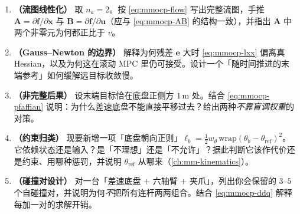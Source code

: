 \begin{practice}[本章练习]
\begin{enumerate}
  \item \textbf{（流图线性化）} 取 $n_a=2$。按 \cref{eq:mmocp-flow} 写出完整流图，手推 $\mathbf A=\partial\mathbf f/\partial\mathbf x$ 与 $\mathbf B=\partial\mathbf f/\partial\mathbf u$（应与 \cref{eq:mmocp-AB} 的结构一致），并指出 $\mathbf A$ 中两个非零元为何都正比于 $v$。
  \item \textbf{（Gauss--Newton 的边界）} 解释为何残差 $\mathbf e$ 大时 \cref{eq:mmocp-lxx} 偏离真 Hessian，以及为何这在滚动 MPC 里仍可接受。设计一个「随时间推进的末端参考」如何缓解远目标收敛慢。
  \item \textbf{（非完整后果）} 设末端目标恰在底盘正侧方 $1\,\mathrm{m}$ 处。结合 \cref{eq:mmocp-pfaffian} 说明：为什么差速底盘不能直接平移过去？给出两种\emph{不靠盲调权重}的对策。
  \item \textbf{（约束归类）} 现要新增一项「底盘朝向正则」$\ell_b=\tfrac12 w_\theta\,\mathrm{wrap}(\theta_b-\theta_{\text{ref}})^2$。它依赖状态还是输入？是「不理想」还是「不允许」？据此判断它该作代价还是约束、用哪种惩罚，并说明 $\theta_{\text{ref}}$ 从哪来（\cref{ch:mm-kinematics}）。
  \item \textbf{（碰撞对设计）} 对一台「差速底盘 $+$ 六轴臂 $+$ 夹爪」，列出你会保留的 $3$--$5$ 个自碰撞对，并说明为何\emph{不}把所有连杆两两组合。结合 \cref{eq:mmocp-ddq} 解释每加一对的求解开销。
\end{enumerate}
\end{practice}
